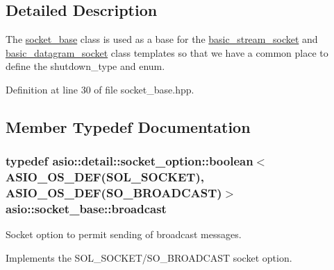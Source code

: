 \subsection{Detailed Description}
The \hyperlink{classasio_1_1socket__base}{socket\+\_\+base} class is used as a base for the \hyperlink{classasio_1_1basic__stream__socket}{basic\+\_\+stream\+\_\+socket} and \hyperlink{classasio_1_1basic__datagram__socket}{basic\+\_\+datagram\+\_\+socket} class templates so that we have a common place to define the shutdown\+\_\+type and enum. 

Definition at line 30 of file socket\+\_\+base.\+hpp.



\subsection{Member Typedef Documentation}
\hypertarget{classasio_1_1socket__base_adb7828bb32a8912680906a66a6551ec3}{}
\subsubsection[{broadcast}]{\setlength{\rightskip}{0pt plus 5cm}typedef {\bf asio\+::detail\+::socket\+\_\+option\+::boolean}$<$ {\bf A\+S\+I\+O\+\_\+\+O\+S\+\_\+\+D\+E\+F}(S\+O\+L\+\_\+\+S\+O\+C\+K\+E\+T), {\bf A\+S\+I\+O\+\_\+\+O\+S\+\_\+\+D\+E\+F}(S\+O\+\_\+\+B\+R\+O\+A\+D\+C\+A\+S\+T)$>$ {\bf asio\+::socket\+\_\+base\+::broadcast}}\label{classasio_1_1socket__base_adb7828bb32a8912680906a66a6551ec3}


Socket option to permit sending of broadcast messages. 

Implements the S\+O\+L\+\_\+\+S\+O\+C\+K\+E\+T/\+S\+O\+\_\+\+B\+R\+O\+A\+D\+C\+A\+S\+T socket option.

